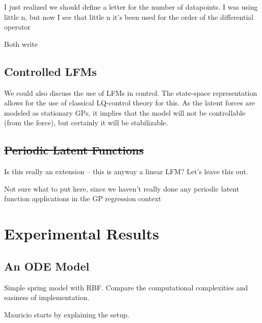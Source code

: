 \documentclass[journal]{IEEEtran}
\newcommand{\mauricio}[1]{{\color{blue}#1}}
\newcommand{\simo}[1]{{\color{red}#1}}
\begin{document}
\mauricio{I just realized we should define a letter for the number of datapoints. I was using little n, but now I see
that little n it's been used for the order of the differential operator}

\simo{Both write}

\subsection{Controlled LFMs}
%
\simo{We could also discuss the use of LFMs in control. The state-space representation allows for the use of classical LQ-control theory for this. As the latent forces are modeled as stationary GPs, it implies that the model will not be controllable (from the force), but certainly it will be stabilizable. }

\subsection{\simo{\st{Periodic Latent Functions}}}

\simo{Is this really an extension -- this is anyway a linear LFM? Let's leave this out.}



\mauricio{Not sure what to put here, since we haven't really done any periodic latent function applications in the GP
regression context}


\section{Experimental Results}

\subsection{An ODE Model}
%
\simo{Simple spring model with RBF. Compare the computational complexities and easiness of implementation.}

\simo{Mauricio starts by explaining the setup.}
\end{document}
